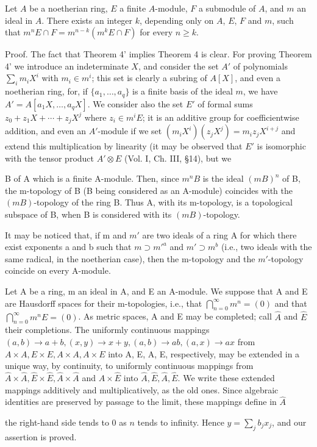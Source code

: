 Let $A$ be a noetherian ring, $E$ a finite $A$-module, $F$ a submodule of $A$, and $m$ an ideal in $A$. There exists an integer $k$, depending only on $A$, $E$, $F$ and $m$, such that $m^n E \cap F = m^{n-k}(m^k E \cap F)$ for every $n \geq k$.

Proof. The fact that Theorem 4' implies Theorem 4 is clear. For proving Theorem 4' we introduce an indeterminate $X$, and consider the set $A'$ of polynomials $\sum_i m_i X^i$ with $m_i \in m^i$; this set is clearly a subring of $A[X]$, and even a noetherian ring, for, if $\{a_1, \ldots, a_q\}$ is a finite basis of the ideal $m$, we have $A' = A[a_1 X, \ldots, a_q X]$. We consider also the set $E'$ of formal sums $z_0 + z_1 X + \cdots + z_j X^j$ where $z_i \in m^i E$; it is an additive group for coefficientwise addition, and even an $A'$-module if we set $(m_i X^i)(z_j X^j) = m_i z_j X^{i+j}$ and extend this multiplication by linearity (it may be observed that $E'$ is isomorphic with the tensor product $A' \otimes E$ (Vol. I, Ch. III, §14), but we

B of A which is a finite A-module. Then, since $m^n B$ is the ideal $(mB)^n$ of B, the m-topology of B (B being considered as an A-module) coincides with the $(mB)$-topology of the ring B. Thus A, with its m-topology, is a topological subspace of B, when B is considered with its $(mB)$-topology.

It may be noticed that, if m and $m'$ are two ideals of a ring A for which there exist exponents a and b such that $m \supset m'^a$ and $m' \supset m^b$ (i.e., two ideals with the same radical, in the noetherian case), then the m-topology and the $m'$-topology coincide on every A-module.

Let A be a ring, m an ideal in A, and E an A-module. We suppose that A and E are Hausdorff spaces for their m-topologies, i.e., that $\bigcap_{n=0}^{\infty} m^n = (0)$ and that $\bigcap_{n=0}^{\infty} m^n E = (0)$. As metric spaces, A and E may be completed; call $\hat{A}$ and $\hat{E}$ their completions. The uniformly continuous mappings $(a, b) \rightarrow a + b, (x, y) \rightarrow x + y, (a, b) \rightarrow ab, (a, x) \rightarrow ax$ from $A \times A, E \times E, A \times A, A \times E$ into A, E, A, E, respectively, may be extended in a unique way, by continuity, to uniformly continuous mappings from $\hat{A} \times \hat{A}, \hat{E} \times \hat{E}, \hat{A} \times \hat{A}$ and $\hat{A} \times \hat{E}$ into $\hat{A}, \hat{E}, \hat{A}, \hat{E}$. We write these extended mappings additively and multiplicatively, as the old ones. Since algebraic identities are preserved by passage to the limit, these mappings define in $\hat{A}$

the right-hand side tends to 0 as $n$ tends to infinity. Hence $y = \sum_j b_j x_j$, and our assertion is proved.